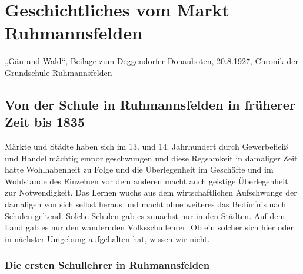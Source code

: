 \documentclass[12pt,a4paper]{book}
\begin{document}
\chapter{Geschichtliches vom Markt Ruhmannsfelden}

„Gäu und Wald“, Beilage zum Deggendorfer Donauboten, 20.8.1927, Chronik
der Grundschule Ruhmannsfelden

\section[Schule bis 1835]{Von der Schule in Ruhmannsfelden in früherer
Zeit bis 1835\protect\footnotemark{}\protect{}}

Märkte und Städte haben sich im 13. und 14. Jahrhundert durch
Gewerbefleiß und Handel mächtig empor geschwungen und diese Regsamkeit
in damaliger Zeit hatte Wohlhabenheit zu Folge und die Überlegenheit im
Geschäfte und im Wohlstande des Einzelnen vor dem anderen macht auch
geistige Überlegenheit zur Notwendigkeit. Das Lernen wuchs aus dem
wirtschaftlichen Aufschwunge der damaligen von sich selbst heraus und
macht ohne weiteres das Bedürfnis nach Schulen geltend. Solche Schulen
gab es zunächst nur in den Städten. Auf dem Land gab es nur den
wandernden Volksschullehrer. Ob ein solcher sich hier oder in nächster
Umgebung aufgehalten hat, wissen wir nicht.

\subsection[Die ersten Schullehrer in Ruhmannsfelden]{Die ersten
Schullehrer in
Ruhmannsfelden\protect\footnotemark{}\protect{}}
\end{document}
